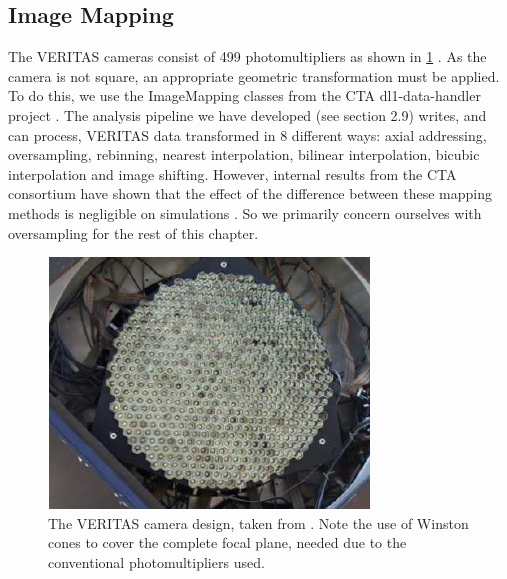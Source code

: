 \subsection{Image Mapping}
The VERITAS cameras consist of 499 photomultipliers as shown in \ref{fig:verc} \cite{vercam}. As the camera is not square, an appropriate geometric transformation must be applied. To do this, we use the ImageMapping classes from the CTA dl1-data-handler project \cite{dl1dh}. The analysis pipeline we have developed (see section 2.9) writes, and can process, VERITAS data transformed in 8 different ways: axial addressing, oversampling, rebinning, nearest interpolation, bilinear interpolation, bicubic interpolation and image shifting. However, internal results from the CTA consortium have shown that the effect of the difference between these mapping methods is negligible on simulations \cite{nietopc}. So we primarily concern ourselves with oversampling for the rest of this chapter.
\begin{figure}[h]
        \begin{center}
        \includegraphics[width=0.6\columnwidth]{figures/verc.png}

        \caption{
                \label{fig:verc} 
                The VERITAS camera design, taken from \cite{vercam}. Note the use of Winston cones to cover the complete focal plane, needed due to the conventional photomultipliers used.
        }
        \end{center}
\end{figure}


